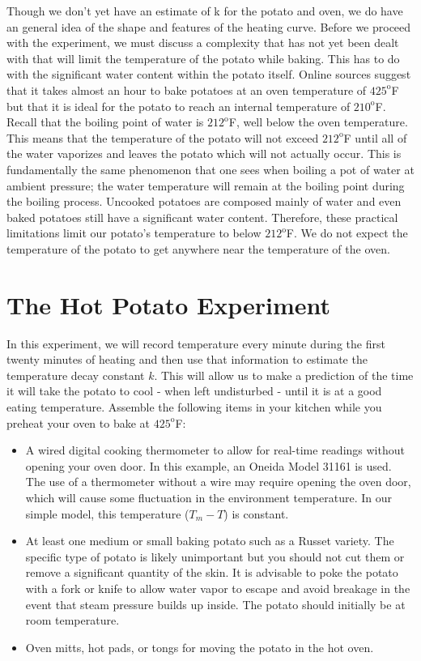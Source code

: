 \documentclass{ximera}
\begin{document}

Though we don’t yet have an estimate of k for the potato and oven, we do have an general idea of the shape and features of the heating curve.  Before we proceed with the experiment, we must discuss a complexity that has not yet been dealt with that will limit the temperature of the potato while baking.  This has to do with the significant water content within the potato itself.  Online sources suggest that it takes almost an hour to bake potatoes at an oven temperature of $425^{\text{o}}$F but that it is ideal for the potato to reach an internal temperature of $210^{\text{o}}$F.  Recall that the boiling point of water is $212^{\text{o}}$F, well below the oven temperature.  This means that the temperature of the potato will not exceed $212^{\text{o}}$F until all of the water vaporizes and leaves the potato which will not actually occur.  This is fundamentally the same phenomenon that one sees when boiling a pot of water at ambient pressure; the water temperature will remain at the boiling point during the boiling process.  Uncooked potatoes are composed mainly of water and even baked potatoes still have a significant water content.  Therefore, these practical limitations limit our potato’s temperature to below $212^{\text{o}}$F.  We do not expect the temperature of the potato to get anywhere near the temperature of the oven.
  
\section*{The Hot Potato Experiment}
In this experiment, we will record temperature every minute during the first twenty minutes of heating and then use that information to estimate the temperature decay constant $k$.  This will allow us to make a prediction of the time it will take the potato to cool - when left undisturbed - until it is at a good eating temperature.
Assemble the following items in your kitchen while you preheat your oven to bake at $425^{\text{o}}$F:
 
\begin{itemize}
\item A wired digital cooking thermometer to allow for real-time readings without opening your oven door. In this example, an Oneida Model 31161 is used.  The use of a thermometer without a wire may require opening the oven door, which will cause some fluctuation in the environment temperature.  In our simple model, this temperature ($T_m-T$) is constant.
\item At least one medium or small baking potato such as a Russet variety. The specific type of potato is likely unimportant but you should not cut them or remove a significant quantity of the skin.  It is advisable to poke the potato with a fork or knife to allow water vapor to escape and avoid breakage in the event that steam pressure builds up inside.  The potato should initially be at room temperature.
\item Oven mitts, hot pads, or tongs for moving the potato in the hot oven.
\end{itemize}
 
\end{document}
